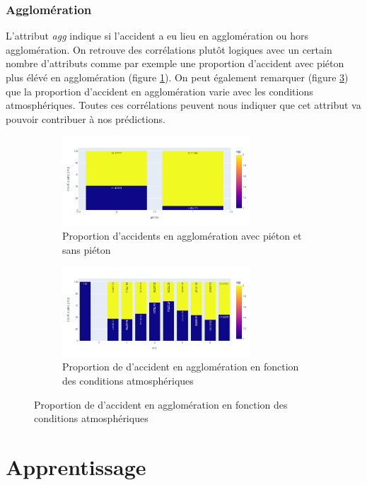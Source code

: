 \documentclass{article}
\begin{document}
    \subsubsection{Agglomération}
    L'attribut \textit{agg} indique si l'accident a eu lieu en agglomération ou hors agglomération. On retrouve 
    des corrélations plutôt logiques avec un certain nombre d'attributs comme par exemple une proportion d'accident avec 
    piéton plus élévé en agglomération (figure \ref{fig:fig_agg_bivar1}). On peut également remarquer (figure \ref{fig:fig_agg_bivar2}) que la proportion 
    d'accident en agglomération varie avec les conditions atmosphériques.
    Toutes ces corrélations peuvent nous indiquer que cet attribut va pouvoir contribuer à nos 
    prédictions.

    \begin{figure}[h]
        \centering
        \begin{subfigure}{7cm}
            \includegraphics[width=7cm]{./img/bivar_agg.png}
            \caption{Proportion d'accidents en agglomération avec piéton et sans piéton}
            \label{fig:fig_agg_bivar1}
        \end{subfigure}
        \hspace{0.2cm}
        \begin{subfigure}{7cm}
            \includegraphics[width=7cm]{./img/bivar_agg2.png}
        \caption{Proportion de d'accident en agglomération en fonction des conditions atmosphériques}
        \label{fig:fig_agg_bivar2}
        \end{subfigure}
    \end{figure}

    \section{Apprentissage}
    
\end{document}
